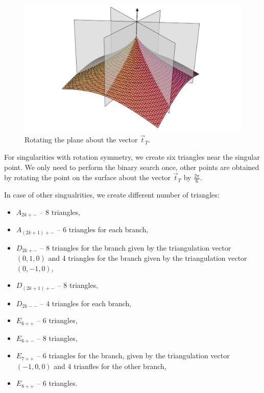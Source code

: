 \begin{figure}
    \centerline{\includegraphics[scale=0.3]{images/rotating-planes}}
    \caption[Rotating the plane about the vector]
    {Rotating the plane about the vector $\vec{t}_T$.}
    \label{img:rotating-planes}
\end{figure}

For singularities with rotation symmetry, we create six
triangles near the singular point. We only need to perform the binary search once,
other points are obtained by rotating the point on the surface about the vector 
$\vec{t}_T$ by $\frac{2 \pi}{6}$.

In case of other singualrities, we create different number of triangles:
\begin{itemize}
    \item $A_{2k+-}$ -- 8 triangles,
    \item $A_{(2k+1)+-}$ -- 6 triangles for each branch,
    \item $D_{2k+-}$ -- 8 triangles for the branch given by the 
    triangulation vector $(0,1,0)$ and 4 triangles for the branch
    given by the triangulation vector $(0,-1,0)$,
    \item $D_{(2k+1)+-}$ -- 8 triangles,
    \item $D_{2k--}$ -- 4 triangles for each branch,
    \item $E_{6++}$ -- 6 triangles,
    \item $E_{6+-}$ -- 8 triangles,
    \item $E_{7++}$ -- 6 triangles for the branch, given by the
    triangulation vector $(-1, 0, 0)$ and 4 trianfles for the other
    branch,
    \item $E_{8++}$ -- 6 triangles.
\end{itemize}

